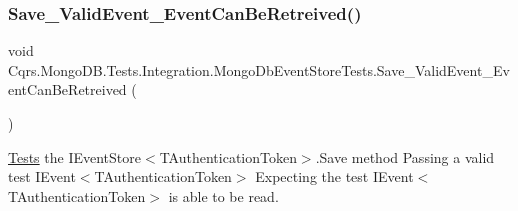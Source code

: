 \subsubsection{\texorpdfstring{Save\+\_\+\+Valid\+Event\+\_\+\+Event\+Can\+Be\+Retreived()}{Save\_ValidEvent\_EventCanBeRetreived()}}
{\footnotesize\ttfamily void Cqrs.\+Mongo\+D\+B.\+Tests.\+Integration.\+Mongo\+Db\+Event\+Store\+Tests.\+Save\+\_\+\+Valid\+Event\+\_\+\+Event\+Can\+Be\+Retreived (\begin{DoxyParamCaption}{ }\end{DoxyParamCaption})}



\hyperlink{namespaceCqrs_1_1MongoDB_1_1Tests}{Tests} the I\+Event\+Store$<$\+T\+Authentication\+Token$>$.\+Save method Passing a valid test I\+Event$<$\+T\+Authentication\+Token$>$ Expecting the test I\+Event$<$\+T\+Authentication\+Token$>$ is able to be read. 

